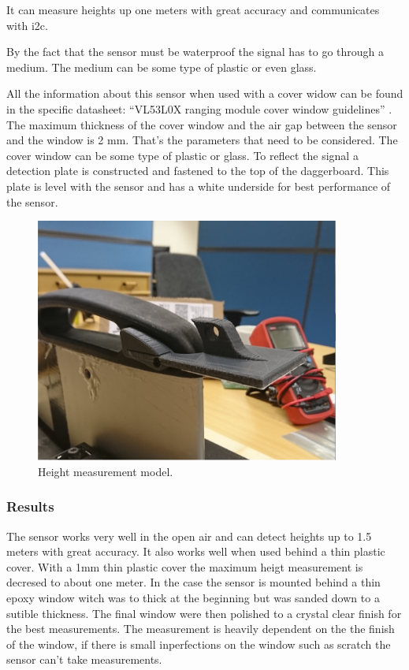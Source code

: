It can measure heights up one meters with great accuracy and communicates with \gls{i2c}.

By the fact that the sensor must be waterproof the signal has to go through a medium. The medium can be some type of plastic or even glass.   

All the information about this sensor when used with a cover widow can be found in the specific datasheet: “VL53L0X ranging module cover window guidelines” \cite{Tof_cover}. The maximum thickness of the cover window and the air gap between the sensor and the window is 2 mm. That’s the parameters that need to be considered. The cover window can be some type of plastic or glass. To reflect the signal a detection plate is constructed and fastened to the top of the daggerboard. This plate is level with the sensor and has a white underside for best performance of the sensor. 

\begin{figure}[H]
	\centering
	\includegraphics[width = 10cm]{Figures/height_measure.jpg}
	\caption{Height measurement model.}
	\label{height_measure}
\end{figure}


\subsubsection{Results}

The sensor works very well in the open air and can detect heights up to 1.5 meters with great accuracy. It also works well when used behind a thin plastic cover. With a 1mm thin plastic cover the maximum heigt measurement is decresed to about one meter. In the case the sensor is mounted behind a thin epoxy window witch was to thick at the beginning but was sanded down to a sutible thickness. The final window were then polished to a crystal clear finish for the best measurements. The measurement is heavily dependent on the the finish of the window, if there is small inperfections on the window such as scratch the sensor can't take measurements.

